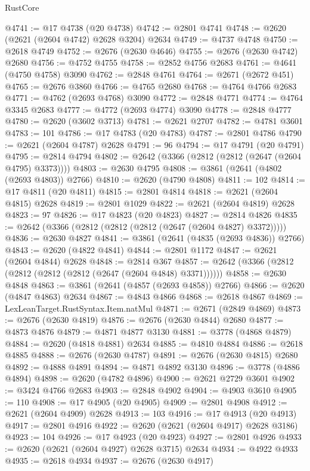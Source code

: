\begin{lexlean}{RustCore}
\begin{coremodule}
@4741 := @17 @4738 (@20 @4738)
@4742 := @2801 @4741
@4748 := @2620 (@2621 (@2604 @4742) @2628 @3204) @2634
@4749 := @4737 @4748
@4750 := @2618 @4749
@4752 := @2676 (@2630 @4646)
@4755 := @2676 (@2630 @4742) @2680
@4756 := @4752 @4755
@4758 := @2852 @4756 @2683
@4761 := @4641 (@4750 @4758) @3090
@4762 := @2848 @4761
@4764 := @2671 (@2672 @451)
@4765 := @2676 @3860
@4766 := @4765 @2680
@4768 := @4764 @4766 @2683
@4771 := @4762 (@2693 @4768) @3090
@4772 := @2848 @4771
@4774 := @4764 @3345 @2683
@4777 := @4772 (@2693 @4774) @3090
@4778 := @2848 @4777
@4780 := @2620 (@3602 @3713)
@4781 := @2621 @2707
@4782 := @4781 @3601
@4783 := 101
@4786 := @17 @4783 (@20 @4783)
@4787 := @2801 @4786
@4790 := @2621 (@2604 @4787) @2628
@4791 := 96
@4794 := @17 @4791 (@20 @4791)
@4795 := @2814 @4794
@4802 := @2642 (@3366 (@2812 (@2812 (@2647 (@2604 @4795) @3373))))
@4803 := @2630 @4795
@4808 := @3861 (@2641 (@4802 (@2693 @4803)) @2766)
@4810 := @2620 (@4790 @4808)
@4811 := 102
@4814 := @17 @4811 (@20 @4811)
@4815 := @2801 @4814
@4818 := @2621 (@2604 @4815) @2628
@4819 := @2801 @1029
@4822 := @2621 (@2604 @4819) @2628
@4823 := 97
@4826 := @17 @4823 (@20 @4823)
@4827 := @2814 @4826
@4835 := @2642 (@3366 (@2812 (@2812 (@2812 (@2647 (@2604 @4827) @3372)))))
@4836 := @2630 @4827
@4841 := @3861 (@2641 (@4835 (@2693 @4836)) @2766)
@4843 := @2620 (@4822 @4841)
@4844 := @2801 @1172
@4847 := @2621 (@2604 @4844) @2628
@4848 := @2814 @367
@4857 := @2642 (@3366 (@2812 (@2812 (@2812 (@2812 (@2647 (@2604 @4848) @3371))))))
@4858 := @2630 @4848
@4863 := @3861 (@2641 (@4857 (@2693 @4858)) @2766)
@4866 := @2620 (@4847 @4863) @2634
@4867 := @4843 @4866
@4868 := @2618 @4867
@4869 := LexLeanTarget.RustSyntax.Item.natMul
@4871 := @2671 (@2849 @4869)
@4873 := @2676 (@2630 @4819)
@4876 := @2676 (@2630 @4844) @2680
@4877 := @4873 @4876
@4879 := @4871 @4877 @3130
@4881 := @3778 (@4868 @4879)
@4884 := @2620 (@4818 @4881) @2634
@4885 := @4810 @4884
@4886 := @2618 @4885
@4888 := @2676 (@2630 @4787)
@4891 := @2676 (@2630 @4815) @2680
@4892 := @4888 @4891
@4894 := @4871 @4892 @3130
@4896 := @3778 (@4886 @4894)
@4898 := @2620 (@4782 @4896)
@4900 := @2621 @2729 @3601
@4902 := @3424 @4766 @2683
@4903 := @2848 @4902
@4904 := @4903 @3610
@4905 := 110
@4908 := @17 @4905 (@20 @4905)
@4909 := @2801 @4908
@4912 := @2621 (@2604 @4909) @2628
@4913 := 103
@4916 := @17 @4913 (@20 @4913)
@4917 := @2801 @4916
@4922 := @2620 (@2621 (@2604 @4917) @2628 @3186)
@4923 := 104
@4926 := @17 @4923 (@20 @4923)
@4927 := @2801 @4926
@4933 := @2620 (@2621 (@2604 @4927) @2628 @3715) @2634
@4934 := @4922 @4933
@4935 := @2618 @4934
@4937 := @2676 (@2630 @4917)

\end{coremodule}
\end{lexlean}
